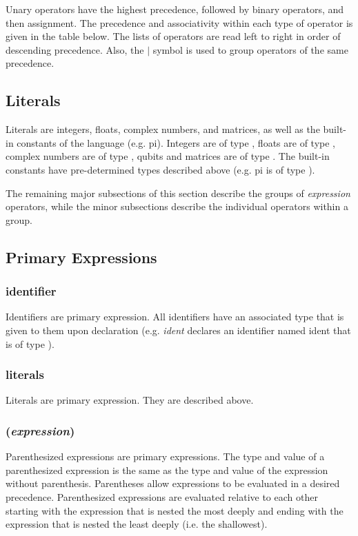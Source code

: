 Unary operators have the highest precedence, followed by binary operators, and then assignment. The precedence and associativity within each type of operator is given in the table below. The lists of operators are read left to right in order of descending precedence. Also, the $|$ symbol is used to group operators of the same precedence.

\subsection{Literals}
Literals are integers, floats, complex numbers, and matrices, as well as the built-in constants of the language (e.g. \textsf{pi}). Integers are of type \integ, floats are of type \float, complex numbers are of type \complex, qubits and matrices are of type \mat. The built-in constants have pre-determined types described above (e.g. \textsf{pi} is of type \float).

The remaining major subsections of this section describe the groups of \textit{expression} operators, while the minor subsections describe the individual operators within a group.
\subsection{Primary Expressions}
\subsubsection{identifier}
Identifiers are primary expression. All identifiers have an associated type that is given to them upon declaration (e.g. \float \textit{ident} declares an identifier named ident that is of type \float).
\subsubsection{literals}
Literals are primary expression. They are described above.

\subsubsection{(\textit{expression})}
Parenthesized expressions are primary expressions. The type and value of a parenthesized expression is the same as the type and value of the expression without parenthesis. Parentheses allow expressions to be evaluated in a desired precedence. Parenthesized expressions are evaluated relative to each other starting with the expression that is nested the most deeply and ending with the expression that is nested the least deeply (i.e. the shallowest).

